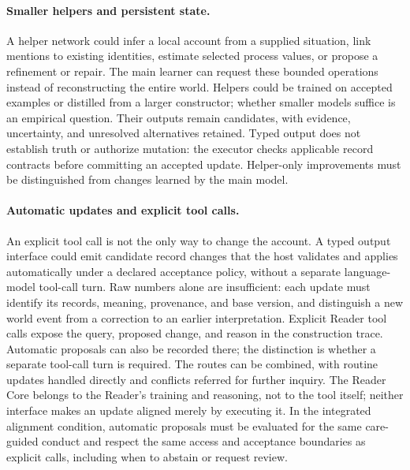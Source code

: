 \documentclass[10pt]{article}
\begin{document}
\paragraph{Smaller helpers and persistent state.}
A helper network could infer a local account from a supplied situation, link
mentions to existing identities, estimate selected process values, or propose
a refinement or repair. The main learner can request these bounded operations
instead of reconstructing the entire world. Helpers could be trained on
accepted examples or distilled from a larger constructor; whether smaller
models suffice is an empirical question. Their outputs remain candidates,
with evidence, uncertainty, and unresolved alternatives retained. Typed output
does not establish truth or authorize mutation: the executor checks applicable
record contracts before committing an accepted update. Helper-only improvements
must be distinguished from changes learned by the main model.

\paragraph{Automatic updates and explicit tool calls.}
An explicit tool call is not the only way to change the account. A typed
output interface could emit candidate record changes that the host validates
and applies automatically under a declared acceptance policy, without a
separate language-model tool-call turn. Raw numbers alone are insufficient: each update
must identify its records, meaning, provenance, and base version, and
distinguish a new world event from a correction to an earlier interpretation.
Explicit Reader tool calls expose the query, proposed change, and reason in
the construction trace. Automatic proposals can also be recorded there; the
distinction is whether a separate tool-call turn is required.
The routes can be combined, with routine
updates handled directly and conflicts referred for further inquiry. The
Reader Core belongs to the Reader's training and reasoning, not to the tool
itself; neither interface makes an update aligned merely by executing it.
In the integrated alignment condition, automatic proposals must be evaluated
for the same care-guided conduct and respect the same access and acceptance
boundaries as explicit calls, including when to abstain or request review.
\end{document}
